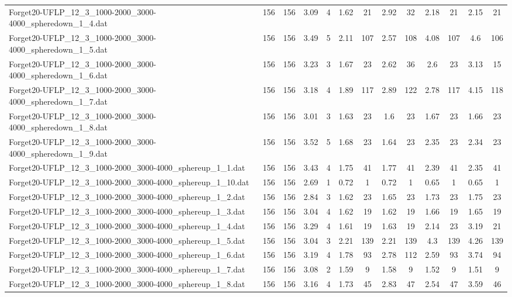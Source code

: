 \begin{table}[!ht]
{\begin{tabular}{lcccccccccccc}
Forget20-UFLP\_12\_3\_1000-2000\_3000-4000\_spheredown\_1\_4.dat & 156 & 156 & 3.09 & 4 & 1.62 & 21 & 2.92 & 32 & 2.18 & 21 & 2.15 & 21 \\
Forget20-UFLP\_12\_3\_1000-2000\_3000-4000\_spheredown\_1\_5.dat & 156 & 156 & 3.49 & 5 & 2.11 & 107 & 2.57 & 108 & 4.08 & 107 & 4.6 & 106 \\
Forget20-UFLP\_12\_3\_1000-2000\_3000-4000\_spheredown\_1\_6.dat & 156 & 156 & 3.23 & 3 & 1.67 & 23 & 2.62 & 36 & 2.6 & 23 & 3.13 & 15 \\
Forget20-UFLP\_12\_3\_1000-2000\_3000-4000\_spheredown\_1\_7.dat & 156 & 156 & 3.18 & 4 & 1.89 & 117 & 2.89 & 122 & 2.78 & 117 & 4.15 & 118 \\
Forget20-UFLP\_12\_3\_1000-2000\_3000-4000\_spheredown\_1\_8.dat & 156 & 156 & 3.01 & 3 & 1.63 & 23 & 1.6 & 23 & 1.67 & 23 & 1.66 & 23 \\
Forget20-UFLP\_12\_3\_1000-2000\_3000-4000\_spheredown\_1\_9.dat & 156 & 156 & 3.52 & 5 & 1.68 & 23 & 1.64 & 23 & 2.35 & 23 & 2.34 & 23 \\
Forget20-UFLP\_12\_3\_1000-2000\_3000-4000\_sphereup\_1\_1.dat & 156 & 156 & 3.43 & 4 & 1.75 & 41 & 1.77 & 41 & 2.39 & 41 & 2.35 & 41 \\
Forget20-UFLP\_12\_3\_1000-2000\_3000-4000\_sphereup\_1\_10.dat & 156 & 156 & 2.69 & 1 & 0.72 & 1 & 0.72 & 1 & 0.65 & 1 & 0.65 & 1 \\
Forget20-UFLP\_12\_3\_1000-2000\_3000-4000\_sphereup\_1\_2.dat & 156 & 156 & 2.84 & 3 & 1.62 & 23 & 1.65 & 23 & 1.73 & 23 & 1.75 & 23 \\
Forget20-UFLP\_12\_3\_1000-2000\_3000-4000\_sphereup\_1\_3.dat & 156 & 156 & 3.04 & 4 & 1.62 & 19 & 1.62 & 19 & 1.66 & 19 & 1.65 & 19 \\
Forget20-UFLP\_12\_3\_1000-2000\_3000-4000\_sphereup\_1\_4.dat & 156 & 156 & 3.29 & 4 & 1.61 & 19 & 1.63 & 19 & 2.14 & 23 & 3.19 & 21 \\
Forget20-UFLP\_12\_3\_1000-2000\_3000-4000\_sphereup\_1\_5.dat & 156 & 156 & 3.04 & 3 & 2.21 & 139 & 2.21 & 139 & 4.3 & 139 & 4.26 & 139 \\
Forget20-UFLP\_12\_3\_1000-2000\_3000-4000\_sphereup\_1\_6.dat & 156 & 156 & 3.19 & 4 & 1.78 & 93 & 2.78 & 112 & 2.59 & 93 & 3.74 & 94 \\
Forget20-UFLP\_12\_3\_1000-2000\_3000-4000\_sphereup\_1\_7.dat & 156 & 156 & 3.08 & 2 & 1.59 & 9 & 1.58 & 9 & 1.52 & 9 & 1.51 & 9 \\
Forget20-UFLP\_12\_3\_1000-2000\_3000-4000\_sphereup\_1\_8.dat & 156 & 156 & 3.16 & 4 & 1.73 & 45 & 2.83 & 47 & 2.54 & 47 & 3.59 & 46 \\

\end{tabular}}
\end{table}
